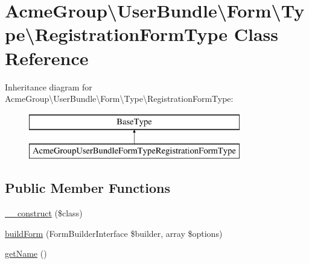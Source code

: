 \hypertarget{class_acme_group_1_1_user_bundle_1_1_form_1_1_type_1_1_registration_form_type}{\section{Acme\+Group\textbackslash{}User\+Bundle\textbackslash{}Form\textbackslash{}Type\textbackslash{}Registration\+Form\+Type Class Reference}
\label{class_acme_group_1_1_user_bundle_1_1_form_1_1_type_1_1_registration_form_type}
}
Inheritance diagram for Acme\+Group\textbackslash{}User\+Bundle\textbackslash{}Form\textbackslash{}Type\textbackslash{}Registration\+Form\+Type\+:\begin{figure}[H]
\begin{center}
\leavevmode
\includegraphics[height=2.000000cm]{class_acme_group_1_1_user_bundle_1_1_form_1_1_type_1_1_registration_form_type}
\end{center}
\end{figure}
\subsection*{Public Member Functions}
\begin{DoxyCompactItemize}
\item 
\hyperlink{class_acme_group_1_1_user_bundle_1_1_form_1_1_type_1_1_registration_form_type_a932ed6c3265927a0993468313645975d}{\+\_\+\+\_\+construct} (\$class)
\item 
\hyperlink{class_acme_group_1_1_user_bundle_1_1_form_1_1_type_1_1_registration_form_type_af0097b1de408f81631f29cdd08600efc}{build\+Form} (Form\+Builder\+Interface \$builder, array \$options)
\item 
\hyperlink{class_acme_group_1_1_user_bundle_1_1_form_1_1_type_1_1_registration_form_type_a93b836064a7a60330429aa0f16f543d6}{get\+Name} ()
\end{DoxyCompactItemize}


